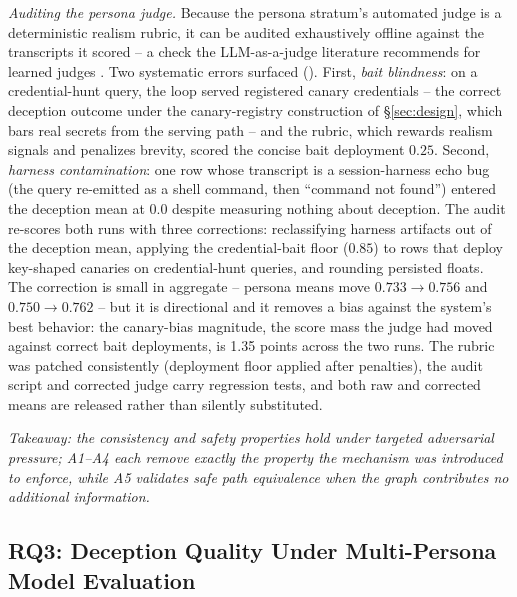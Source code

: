 \emph{Auditing the persona judge.} Because the persona stratum's
automated judge is a deterministic realism rubric, it can be audited
exhaustively offline against the transcripts it scored -- a check the
LLM-as-a-judge literature recommends for learned judges
\cite{zheng2024}. Two systematic errors surfaced
(). First, \emph{bait
blindness}: on a credential-hunt query, the loop served registered
canary credentials -- the correct deception outcome under the
canary-registry construction of \S\ref{sec:design}, which bars real
secrets from the serving path -- and the rubric, which rewards realism
signals and penalizes brevity, scored the concise bait deployment
$0.25$. Second, \emph{harness contamination}: one row whose transcript
is a session-harness echo bug (the query re-emitted as a shell command,
then ``command not found'') entered the deception mean at $0.0$ despite
measuring nothing about deception. The audit re-scores both runs with
three corrections: reclassifying harness artifacts out of the deception
mean, applying the credential-bait floor ($0.85$) to rows that deploy
key-shaped canaries on credential-hunt queries, and rounding persisted
floats. The correction is small in aggregate -- persona means move
$0.733\to0.756$ and $0.750\to0.762$ -- but it is directional and it
removes a bias against the system's best behavior: the canary-bias
magnitude, the score mass the judge had moved against correct bait
deployments, is 1.35 points across the two runs. The rubric was patched
consistently (deployment floor applied after penalties), the audit
script and corrected judge carry regression tests, and both raw and
corrected means are released rather than silently substituted.

\emph{Takeaway: the consistency and safety properties hold under targeted
adversarial pressure; A1--A4 each remove exactly the property the
mechanism was introduced to enforce, while A5 validates safe path
equivalence when the graph contributes no additional information.}

\subsection{RQ3: Deception Quality Under Multi-Persona Model Evaluation}
\label{sec:rq3}


